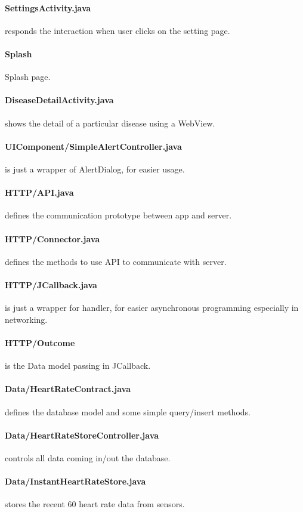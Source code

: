 \documentclass[10pt,a4paper,final]{scrartcl}
\begin{document}
\paragraph{SettingsActivity.java} responds the interaction when user clicks on the setting page.
\paragraph{Splash} Splash page.
\paragraph{DiseaseDetailActivity.java} shows the detail of a particular disease using a WebView.
\paragraph{UIComponent/SimpleAlertController.java} is just a wrapper of AlertDialog, for easier usage.
\paragraph{HTTP/API.java} defines the communication prototype between app and server.
\paragraph{HTTP/Connector.java} defines the methods to use API to communicate with server.
\paragraph{HTTP/JCallback.java} is just a wrapper for handler, for easier asynchronous programming especially in networking.
\paragraph{HTTP/Outcome} is the Data model passing in JCallback.
\paragraph{Data/HeartRateContract.java} defines the database model and some simple query/insert methods.
\paragraph{Data/HeartRateStoreController.java} controls all data coming in/out the database.
\paragraph{Data/InstantHeartRateStore.java} stores the recent 60 heart rate data from sensors.
\end{document}
